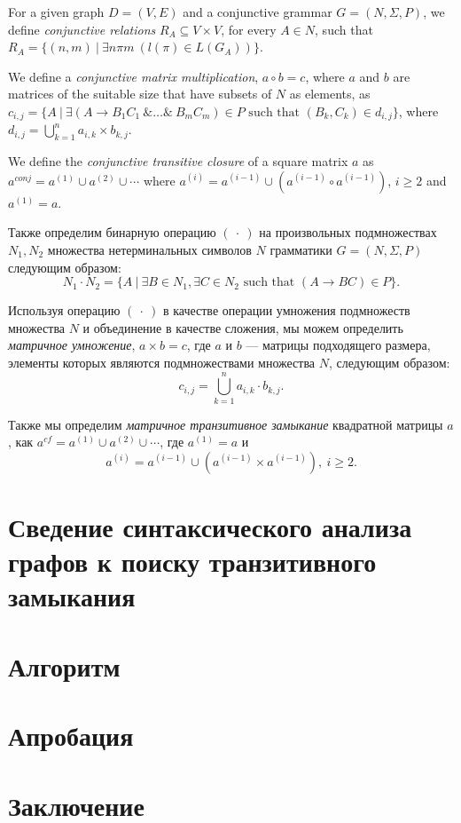 \documentclass [a4paper] {article}
\begin{document}
	For a given graph $D = (V, E)$ and a conjunctive grammar $G = (N, \Sigma, P)$, we define \textit{conjunctive relations} $R_A \subseteq V \times V$, for every $A \in N$, such that $R_A = \{(n,m)~|~\exists n \pi m~(l(\pi) \in L(G_A))\}$.
	
	We define a \textit{conjunctive matrix multiplication}, $a \circ b = c$, where $a$ and $b$ are matrices of the suitable size that have subsets of $N$ as elements, as $c_{i,j} = \{A~|~\exists (A \rightarrow B_1 C_1~\& \ldots \&~B_m C_m) \in P \text{ such that } (B_k, C_k) \in d_{i,j} \}$, where $d_{i,j} = \bigcup^{n}_{k=1}{a_{i,k} \times b_{k,j}}$. 
	
	We define the \textit{conjunctive transitive closure} of a square matrix $a$ as $a^{conj} = a^{(1)} \cup a^{(2)} \cup \cdots$ where $a^{(i)} = a^{(i-1)} \cup (a^{(i-1)} \circ a^{(i-1)})$, $i \ge 2$ and $a^{(1)} = a$.
	
	Также определим бинарную операцию $(~\cdot~)$ на произвольных подмножествах $N_1 , N_2$ множества нетерминальных символов $N$ грамматики $G = (N, \Sigma, P)$ следующим образом: $$N_1 \cdot N_2 = \{A~|~\exists B \in N_1, \exists C \in N_2 \text{ such that }(A \rightarrow B C) \in P\}.$$

	Используя операцию $(~\cdot~)$ в качестве операции умножения подмножеств множества $N$ и объединение в качестве сложения, мы можем определить \textit{матричное умножение}, $a \times b = c$, где $a$ и $b$ --- матрицы подходящего размера, элементы которых являются подмножествами множества $N$, следующим образом: $$c_{i,j} = \bigcup^{n}_{k=1}{a_{i,k} \cdot b_{k,j}}.$$

	Также мы определим \textit{матричное транзитивное замыкание} квадратной матрицы $a$, как $a^{cf} = a^{(1)} \cup a^{(2)} \cup \cdots$, где $a^{(1)} = a$ и $$a^{(i)} = a^{(i-1)} \cup (a^{(i-1)} \times a^{(i-1)}), ~i \ge 2.$$
	\section{Сведение синтаксического анализа графов к поиску транзитивного замыкания}
	
	\section{Алгоритм}
	\section{Апробация}
	\section{Заключение}
	
	
	\printbibliography
	
\end{document}
